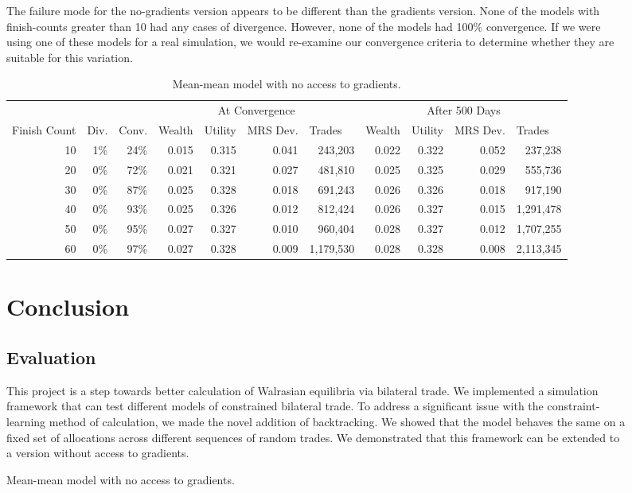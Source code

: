\documentclass[12pt,a4paper,titlepage]{article}
\newcommand{\co}[1]{\textsf{#1}}
\begin{document}
\begin{figure}[H]
The failure mode for the no-gradients version appears to be different than the gradients version.
None of the models with finish-counts greater than 10 had any cases of divergence.
However, none of the models had 100\% convergence.
If we were using one of these models for a real simulation, we would re-examine our convergence criteria to determine whether they are suitable for this variation.

\begin{table}
  \begin{tabular}{r|rr|rrrr|rrrr}
    
    & \multicolumn{1}{|l}{} & \multicolumn{1}{l}{} & \multicolumn{ 4}{|c|}{At Convergence} & \multicolumn{ 4}{c}{After 500 Days} \\ 
    Finish Count & \multicolumn{1}{|l}{Div.} & \multicolumn{1}{l}{Conv.} & \multicolumn{1}{|l}{Wealth} & \multicolumn{1}{l}{Utility} & \multicolumn{1}{l}{MRS Dev.} & \multicolumn{1}{l}{Trades} & \multicolumn{1}{|l}{Wealth} & \multicolumn{1}{l}{Utility} & \multicolumn{1}{l}{MRS Dev.} & \multicolumn{1}{l}{Trades} \\ 
    \hline
    10 & 1\% & 24\% & 0.015 & 0.315 & 0.041 & 243,203   & 0.022 & 0.322 & 0.052 & 237,238 \\
    20 & 0\% & 72\% & 0.021 & 0.321 & 0.027 & 481,810   & 0.025 & 0.325 & 0.029 & 555,736 \\
    30 & 0\% & 87\% & 0.025 & 0.328 & 0.018 & 691,243   & 0.026 & 0.326 & 0.018 & 917,190 \\
    40 & 0\% & 93\% & 0.025 & 0.326 & 0.012 & 812,424   & 0.026 & 0.327 & 0.015 & 1,291,478 \\
    50 & 0\% & 95\% & 0.027 & 0.327 & 0.010 & 960,404   & 0.028 & 0.327 & 0.012 & 1,707,255 \\
    60 & 0\% & 97\% & 0.027 & 0.328 & 0.009 & 1,179,530 & 0.028 & 0.328 & 0.008 & 2,113,345 \\
  \end{tabular}
  \caption{\co{Mean}-\co{mean} model with no access to gradients.}
  \label{tab:ut}
\end{table}

\clearpage

\section{Conclusion}\label{conclusion}

\subsection{Evaluation}
This project is a step towards better calculation of Walrasian equilibria via bilateral trade.
We implemented a simulation framework that can test different models of constrained bilateral trade.
To address a significant issue with the constraint-learning method of calculation, we made the novel addition of backtracking.
We showed that the model behaves the same on a fixed set of allocations across different sequences of random trades.
We demonstrated that this framework can be extended to a version without access to gradients.


\end{figure}
\end{document}
